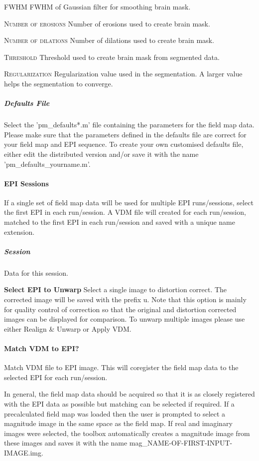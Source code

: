 \textsc{FWHM}
FWHM of Gaussian filter for smoothing brain mask.


\textsc{Number of erosions}
Number of erosions used to create brain mask.


\textsc{Number of dilations}
Number of dilations used to create brain mask.


\textsc{Threshold}
Threshold used to create brain mask from segmented data.


\textsc{Regularization}
Regularization value used in the segmentation. A larger value helps the segmentation to converge.


\subparagraph{Defaults File \label{PMDEF}}
Select the 'pm\_defaults*.m' file containing the parameters for the field map data. Please make sure that the parameters defined in the defaults file are correct for your field map and EPI sequence. To create your own customised defaults file, either edit the distributed version and/or save it with the name 'pm\_defaults\_yourname.m'.


\paragraph{EPI Sessions}
If a single set of field map data will be used for multiple EPI runs/sessions, select the first EPI in each run/session. A VDM file will created for each run/session, matched to the first EPI in each run/session and saved with a unique name extension.


\subparagraph{Session}
Data for this session.


\textbf{Select EPI to Unwarp}
Select a single image to distortion correct. The corrected image will be saved with the prefix u. Note that this option is mainly for quality control of correction so that the original and distortion corrected images can be displayed for comparison. To unwarp multiple images please use either Realign \& Unwarp or Apply VDM.


\paragraph{Match VDM to EPI?}
Match VDM file to EPI image. This will coregister the field map data to the selected EPI for each run/session.

In general, the field map data should be acquired so that it is as closely registered with the EPI data as possible but matching can be selected if required. If a precalculated field map was loaded then the user is prompted to select a magnitude image in the same space as the field map. If real and imaginary images were selected, the toolbox automatically creates a magnitude image from these images and saves it with the name mag\_NAME-OF-FIRST-INPUT-IMAGE.img. 

